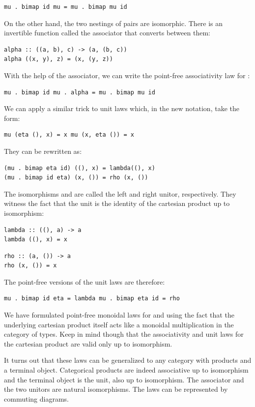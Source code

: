 \begin{verbatim}
mu . bimap id mu = mu . bimap mu id
\end{verbatim}
On the other hand, the two nestings of pairs are isomorphic. There is an
invertible function called the associator that converts between them:

\begin{verbatim}
alpha :: ((a, b), c) -> (a, (b, c))
alpha ((x, y), z) = (x, (y, z))
\end{verbatim}
With the help of the associator, we can write the point-free
associativity law for :

\begin{verbatim}
mu . bimap id mu . alpha = mu . bimap mu id
\end{verbatim}
We can apply a similar trick to unit laws which, in the new notation,
take the form:

\begin{verbatim}
mu (eta (), x) = x mu (x, eta ()) = x
\end{verbatim}
They can be rewritten as:

\begin{verbatim}
(mu . bimap eta id) ((), x) = lambda((), x)
(mu . bimap id eta) (x, ()) = rho (x, ())
\end{verbatim}
The isomorphisms  and  are called the left
and right unitor, respectively. They witness the fact that the unit
\code{()} is the identity of the cartesian product up to isomorphism:

\begin{verbatim}
lambda :: ((), a) -> a
lambda ((), x) = x
\end{verbatim}
\begin{verbatim}
rho :: (a, ()) -> a
rho (x, ()) = x
\end{verbatim}
The point-free versions of the unit laws are therefore:

\begin{verbatim}
mu . bimap id eta = lambda mu . bimap eta id = rho
\end{verbatim}
We have formulated point-free monoidal laws for  and
 using the fact that the underlying cartesian product itself
acts like a monoidal multiplication in the category of types. Keep in
mind though that the associativity and unit laws for the cartesian
product are valid only up to isomorphism.

It turns out that these laws can be generalized to any category with
products and a terminal object. Categorical products are indeed
associative up to isomorphism and the terminal object is the unit, also
up to isomorphism. The associator and the two unitors are natural
isomorphisms. The laws can be represented by commuting diagrams.

